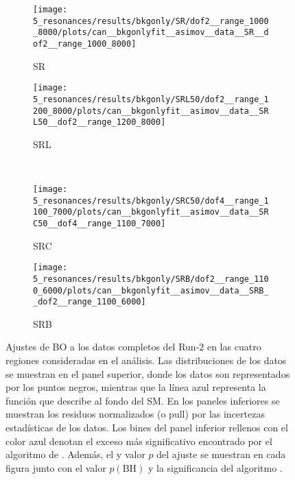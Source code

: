 \begin{figure}[ht!]
    \centering
    \begin{subfigure}[h]{0.49\linewidth}
        \centering
        \texttt{[image: 5\_resonances/results/bkgonly/SR/dof2\_\_range\_1000\_8000/plots/can\_\_bkgonlyfit\_\_asimov\_\_data\_\_SR\_\_dof2\_\_range\_1000\_8000]}
        \caption{SR}
        \label{fig:results:results:bkgonly:fits:SR}
    \end{subfigure}
    \hfill
    \begin{subfigure}[h]{0.49\linewidth}
        \centering
        \texttt{[image: 5\_resonances/results/bkgonly/SRL50/dof2\_\_range\_1200\_8000/plots/can\_\_bkgonlyfit\_\_asimov\_\_data\_\_SRL50\_\_dof2\_\_range\_1200\_8000]}
        \caption{SRL}
        \label{fig:results:results:bkgonly:fits:SRL50}
    \end{subfigure}\\
    \begin{subfigure}[h]{0.49\linewidth}
        \centering
        \texttt{[image: 5\_resonances/results/bkgonly/SRC50/dof4\_\_range\_1100\_7000/plots/can\_\_bkgonlyfit\_\_asimov\_\_data\_\_SRC50\_\_dof4\_\_range\_1100\_7000]}
        \caption{SRC}
        \label{fig:results:results:bkgonly:fits:SRC}
    \end{subfigure}
    \hfill
    \begin{subfigure}[h]{0.49\linewidth}
        \centering
        \texttt{[image: 5\_resonances/results/bkgonly/SRB/dof2\_\_range\_1100\_6000/plots/can\_\_bkgonlyfit\_\_asimov\_\_data\_\_SRB\_\_dof2\_\_range\_1100\_6000]}
        \caption{SRB}
        \label{fig:results:results:bkgonly:fits:SRB}
    \end{subfigure}
    \caption{Ajustes de \ac{BO} a los datos completos del Run-2 en las cuatro regiones consideradas en el análisis. Las distribuciones de los datos se muestran en el panel superior, donde los datos son representados por los puntos negros, mientras que la línea azul representa la función que describe al fondo del \ac{SM}. En los paneles inferiores se muestran los residuos normalizados (o pull) por las incertezas estadísticas de los datos. Los bines del panel inferior rellenos con el color azul denotan el exceso más significativo encontrado por el algoritmo de \bh. Además, el \chisq y valor \(p\) del ajuste se muestran en cada figura junto con el valor \(p \left(\text{BH}\right)\) y la significancia del algoritmo \bh.}
    \label{fig:results:results:bkgonly:fits}
\end{figure}

